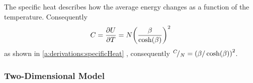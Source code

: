 	The specific heat describes how the average energy changes as a function of the temperature. Consequently
	\begin{equation}
		C = \frac{\partial U}{\partial T} = N {\left(\frac{\beta}{\cosh(\beta)}\right)}^{2}
	\end{equation}
	as shown in \cref{a:derivations:specificHeat} \cite{warkHandout}, consequently ${}^{C}\!/_{N} = {\left(\beta / \cosh(\beta) \right)}^2$.
 
\subsubsection{Two-Dimensional Model}
	\label{sss:intro:ising:2D}
